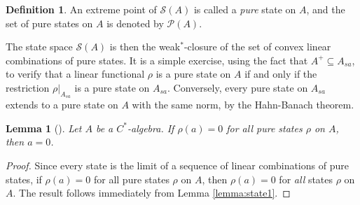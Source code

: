 \documentclass[12pt,a4paper]{report}
\theoremstyle{plain}
\newtheorem{lemma}{Lemma}
\theoremstyle{definition}
\newtheorem{defn}{Definition}
\newcommand{\1}{\mathbbm{1}}
\renewcommand{\S}{\mathscr{S}}
\renewcommand{\P}[1]{\mathscr{P}(#1)}
\begin{document}
\begin{defn}
	An extreme point of $\S(A)$ is called a \emph{pure} state on $A$, and the set of pure 
	states on $A$ is denoted by $\P{A}$.
\end{defn}
The state space $\S(A)$ is then the weak$^\ast$-closure of the set of convex linear combinations of pure 
states. 
It is a simple exercise, using the fact that $A^+\subseteq A_{sa}$, to verify that a linear 
functional $\rho$ is a pure state on $A$ if and only if the restriction $\rho|_{A_{sa}}$ is a pure
state on $A_{sa}$.
Conversely, every pure state on $A_{sa}$ extends to a pure state on $A$ with the same norm, by the 
Hahn-Banach theorem. 

\begin{lemma}[{\cite[4.3.8,(i)]{kadison83}}]\label{lemma:pure1}
	Let $A$ be a $C^\ast$-algebra. If $\rho(a)=0$ for all \emph{pure} states $\rho$ on $A$, then $a=0$.
\end{lemma}
\begin{proof}
	Since every state is the limit of a sequence of linear combinations of pure states, if $\rho(a)=0$ 
	for all pure states $\rho$ on $A$, then $\rho(a)=0$ for \emph{all} states $\rho$ on $A$. The result 
	follows immediately from Lemma \ref{lemma:state1}.
\end{proof}
\end{document}
